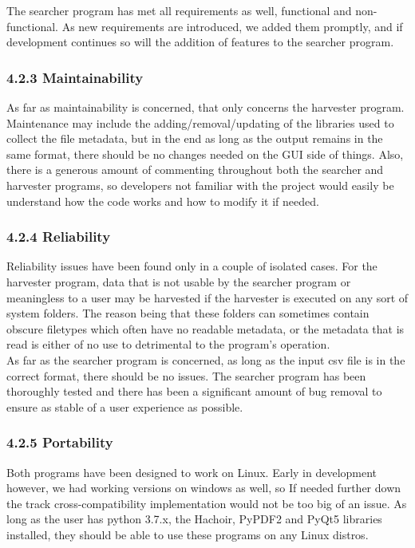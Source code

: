 \documentclass[11pt]{article}
\begin{document}
\begin{adjustwidth}{1cm}{}
The searcher program has met all requirements as well, functional and non-functional. As new requirements are introduced, we added them promptly, and if development continues so will the addition of features to the searcher program.

\subsubsection{4.2.3 Maintainability}
As far as maintainability is concerned, that only concerns the harvester program. Maintenance may include the adding/removal/updating of the libraries used to collect the file metadata, but in the end as long as the output remains in the same format, there should be no changes needed on the GUI side of things. Also, there is a generous amount of commenting throughout both the searcher and harvester programs, so developers not familiar with the project would easily be understand how the code works and how to modify it if needed.

\subsubsection{4.2.4 Reliability}
Reliability issues have been found only in a couple of isolated cases. For the harvester program, data that is not usable by the searcher program or meaningless to a user may be harvested if the harvester is executed on any sort of system folders. The reason being that these folders can sometimes contain obscure filetypes which often have no readable metadata, or the metadata that is read is either of no use to detrimental to the program’s operation. \\

As far as the searcher program is concerned, as long as the input csv file is in the correct format, there should be no issues. The searcher program has been thoroughly tested and there has been a significant amount of bug removal to ensure as stable of a user experience as possible.

\subsubsection{4.2.5 Portability}
Both programs have been designed to work on Linux. Early in development however, we had working versions on windows as well, so If needed further down the track cross-compatibility implementation would not be too big of an issue. As long as the user has python 3.7.x, the Hachoir, PyPDF2 and PyQt5 libraries installed, they should be able to use these programs on any Linux distros.


\end{adjustwidth}
\end{document}
